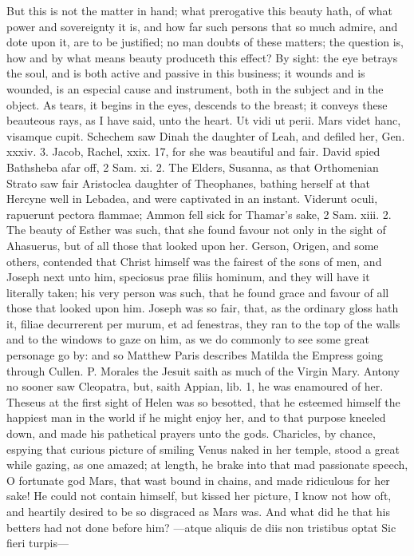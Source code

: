 {But this is not the matter in hand; what prerogative this beauty hath,
of what power and sovereignty it is, and how far such persons that so
much admire, and dote upon it, are to be justified; no man doubts of
these matters; the question is, how and by what means beauty produceth
this effect? By sight: the eye betrays the soul, and is both active and
passive in this business; it wounds and is wounded, is an especial
cause and instrument, both in the subject and in the object. As
tears, it begins in the eyes, descends to the breast; it conveys these
beauteous rays, as I have said, unto the heart. Ut vidi ut perii.
Mars videt hanc, visamque cupit. Schechem saw Dinah the daughter
of Leah, and defiled her, Gen. xxxiv. 3. Jacob, Rachel, xxix. 17, for
she was beautiful and fair. David spied Bathsheba afar off, 2 Sam. xi.
2. The Elders, Susanna, as that Orthomenian Strato saw fair
Aristoclea daughter of Theophanes, bathing herself at that Hercyne well
in Lebadea, and were captivated in an instant. Viderunt oculi,
rapuerunt pectora flammae; Ammon fell sick for Thamar's sake, 2 Sam.
xiii. 2. The beauty of Esther was such, that she found favour not only
in the sight of Ahasuerus, but of all those that looked upon her.
Gerson, Origen, and some others, contended that Christ himself was the
fairest of the sons of men, and Joseph next unto him, speciosus prae
filiis hominum, and they will have it literally taken; his very person
was such, that he found grace and favour of all those that looked upon
him. Joseph was so fair, that, as the ordinary gloss hath it, filiae
decurrerent per murum, et ad fenestras, they ran to the top of the
walls and to the windows to gaze on him, as we do commonly to see some
great personage go by: and so Matthew Paris describes Matilda the
Empress going through Cullen. P. Morales the Jesuit saith as much
of the Virgin Mary. Antony no sooner saw Cleopatra, but, saith Appian,
lib. 1, he was enamoured of her. Theseus at the first sight of
Helen was so besotted, that he esteemed himself the happiest man in the
world if he might enjoy her, and to that purpose kneeled down, and made
his pathetical prayers unto the gods. Charicles, by chance,
espying that curious picture of smiling Venus naked in her temple,
stood a great while gazing, as one amazed; at length, he brake into
that mad passionate speech, O fortunate god Mars, that wast bound in
chains, and made ridiculous for her sake! He could not contain himself,
but kissed her picture, I know not how oft, and heartily desired to be
so disgraced as Mars was. And what did he that his betters had not done
before him?
---atque aliquis de diis non tristibus optat
Sic fieri turpis---

}
